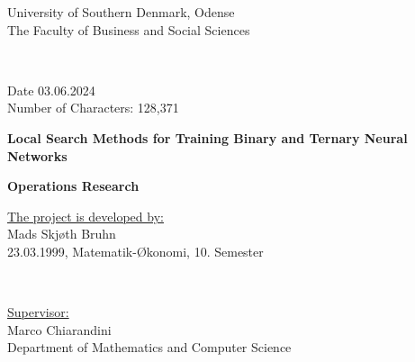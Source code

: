 \begin{titlepage}
	\hspace*{-1cm}
	\begin{minipage}[t][5cm][t]{0,6\textwidth}
	\begin{flushleft}
	University of Southern Denmark, Odense
	\\
	The Faculty of Business and Social Sciences
	\end{flushleft}
	\end{minipage}
	~
	\begin{minipage}[t][5cm][t]{0,5\textwidth}
	\begin{flushright}
	Date 03.06.2024
	\\
	Number of Characters: 128,371
	\end{flushright}
	\end{minipage}

\vfill
	\begin{center}
	\huge\bfseries Local Search Methods for Training Binary  and Ternary Neural Networks
	\end{center}
	\begin{center}
	\huge\bfseries Operations Research
	\end{center}
	\vfill

	\hspace*{-1cm}
	\begin{minipage}[b][5cm][b]{0,6\textwidth}
	\begin{flushleft}
	\uline{The project is developed by:}
	\\
	Mads Skjøth Bruhn 
	\\
	23.03.1999, Matematik-Økonomi, 10. Semester
	\end{flushleft}
	\end{minipage}
	~
	\begin{minipage}[b][5cm][b]{0,4\textwidth}
	\begin{flushright}
	
	\uline{Supervisor:}
	\\
	Marco Chiarandini
	\\
	Department of Mathematics and Computer Science
	\end{flushright}
	\end{minipage}
\end{titlepage}
